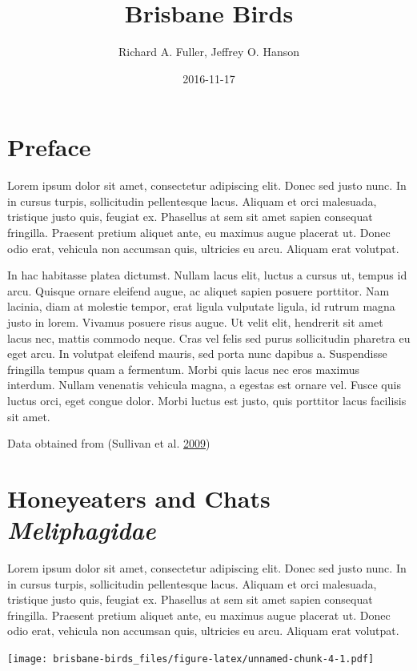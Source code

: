 \documentclass[]{book}
\title{Brisbane Birds}
\author{Richard A. Fuller, Jeffrey O. Hanson}
\date{2016-11-17}
\begin{document}
\maketitle

{
\setcounter{tocdepth}{1}
\tableofcontents
}
\chapter{Preface}\label{preface}

Lorem ipsum dolor sit amet, consectetur adipiscing elit. Donec sed justo
nunc. In in cursus turpis, sollicitudin pellentesque lacus. Aliquam et
orci malesuada, tristique justo quis, feugiat ex. Phasellus at sem sit
amet sapien consequat fringilla. Praesent pretium aliquet ante, eu
maximus augue placerat ut. Donec odio erat, vehicula non accumsan quis,
ultricies eu arcu. Aliquam erat volutpat.

In hac habitasse platea dictumst. Nullam lacus elit, luctus a cursus ut,
tempus id arcu. Quisque ornare eleifend augue, ac aliquet sapien posuere
porttitor. Nam lacinia, diam at molestie tempor, erat ligula vulputate
ligula, id rutrum magna justo in lorem. Vivamus posuere risus augue. Ut
velit elit, hendrerit sit amet lacus nec, mattis commodo neque. Cras vel
felis sed purus sollicitudin pharetra eu eget arcu. In volutpat eleifend
mauris, sed porta nunc dapibus a. Suspendisse fringilla tempus quam a
fermentum. Morbi quis lacus nec eros maximus interdum. Nullam venenatis
vehicula magna, a egestas est ornare vel. Fusce quis luctus orci, eget
congue dolor. Morbi luctus est justo, quis porttitor lacus facilisis sit
amet.

Data obtained from (Sullivan et al. \protect\hyperlink{ref-r1}{2009})

\chapter{\texorpdfstring{Honeyeaters and Chats
\emph{Meliphagidae}}{Honeyeaters and Chats Meliphagidae}}\label{honeyeaters-and-chats-meliphagidae}

Lorem ipsum dolor sit amet, consectetur adipiscing elit. Donec sed justo
nunc. In in cursus turpis, sollicitudin pellentesque lacus. Aliquam et
orci malesuada, tristique justo quis, feugiat ex. Phasellus at sem sit
amet sapien consequat fringilla. Praesent pretium aliquet ante, eu
maximus augue placerat ut. Donec odio erat, vehicula non accumsan quis,
ultricies eu arcu. Aliquam erat volutpat.

\texttt{[image: brisbane-birds\_files/figure-latex/unnamed-chunk-4-1.pdf]}
\end{document}
